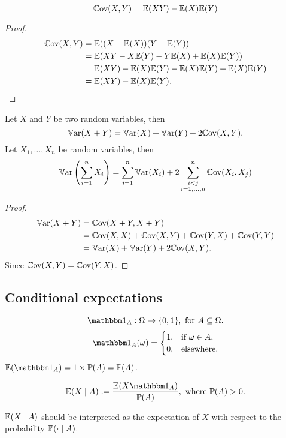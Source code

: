 \documentclass[10pt, a4paper]{article}
\begin{document}
\begin{corollary}
    \[
    \Cov(X, Y) = \E(XY) - \E(X)\E(Y)
    \]
    \begin{proof}
        \begin{align*}
            \Cov(X, Y) &= \E((X - \E(X))(Y - \E(Y)) \\
            &= \E(XY - X\E(Y) - Y\E(X) + \E(X)\E(Y)) \\
            &= \E(XY) - \E(X)\E(Y) - \E(X)\E(Y) + \E(X)\E(Y) \\
            &= \E(XY) - \E(X)\E(Y).
        \end{align*}
    \end{proof}
\end{corollary}

\begin{theorem}
    Let $X$ and $Y$ be two random variables,
    then
    \[
    \Var(X + Y) = \Var(X) + \Var(Y) + 2\Cov(X, Y).
    \]
    Let $X_1, \dotsc, X_n$ be random variables,
    then
    \[
    \Var\left(\sum_{i = 1}^{n}X_i\right) = \sum_{i = 1}^{n}\Var(X_i) + 2\sum_{\begin{subarray}{c}
        i < j \\
        i = 1, \dotsc, n
    \end{subarray}}^{n}\Cov(X_i, X_j)
    \]
    \begin{proof}
        \begin{align*}
            \Var(X + Y) &= \Cov(X + Y, X + Y) \\
            &= \Cov(X, X) + \Cov(X, Y) + \Cov(Y, X) + \Cov(Y, Y) \\
            &= \Var(X) + \Var(Y) + 2\Cov(X, Y).
        \end{align*}
        Since $\Cov(X, Y) = \Cov(Y, X)$.
    \end{proof}
\end{theorem}

\subsection{Conditional expectations}
\[
\ind : \Omega \rightarrow \{0, 1\}, \text{ for } A \subseteq \Omega.
\]
\[
\ind(\omega) = \begin{cases}
    1, & \text{if } \omega \in A, \\
    0, & \text{elsewhere}.
\end{cases}
\]
$\E(\ind) = 1 \times \P(A) = \P(A)$.

\begin{definition}
    \[
    \E(X\mid A) := \frac{\E(X\ind)}{\P(A)},\text{ where $\P(A) > 0$}.
    \]
\end{definition}
$\E(X \mid A)$ should be interpreted as the expectation of $X$ with respect to the probability $\P(\cdot\mid A)$.
\end{document}
